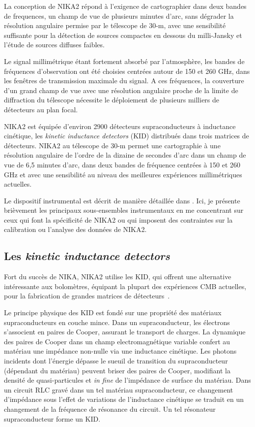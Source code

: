 La conception de NIKA2 répond à l'exigence de cartographier dans deux
bandes de frequences, un champ de vue de plusieurs minutes d'arc, sans
dégrader la résolution angulaire permise par le télescope de 30-m,
avec une sensibilité suffisante pour la détection de sources compactes
en dessous du milli-Jansky et l'étude de sources diffuses faibles.

Le signal millimétrique étant fortement absorbé par l'atmosphère, les
bandes de fréquences d'observation ont été choisies centrées
autour de 150 et 260 GHz, dans les fenêtres de transmission maximale
du signal. A ces fréquences, la couverture d'un grand champ de vue
avec une résolution angulaire proche de la limite de diffraction du
télescope nécessite le déploiement de plusieurs milliers de détecteurs
au plan focal.

NIKA2 est équipée d'environ 2900 détecteurs supraconducteurs à inductance
cinétique, les \emph{kinetic inductance detectors} (KID) distribués
dans trois matrices de détecteurs. NIKA2 au télescope de 30-m permet
une cartographie à une résolution angulaire de l'ordre de la dizaine
de secondes d'arc dans un champ de vue de 6,5 minutes d'arc, dans deux
bandes de fréquence centrées à 150 et 260 GHz et avec une sensibilité
au niveau des meilleures expériences millimétriques actuelles.

Le dispositif instrumental est décrit de manière détaillée dans
\citet{Adam2018}. Ici, je présente brièvement les principaux
sous-ensembles instrumentaux en me concentrant sur ceux qui font la
spécificité de NIKA2 ou qui imposent des contraintes sur la
calibration ou l'analyse des données de NIKA2.


\subsection{Les \emph{kinetic inductance detectors}}
\label{se:kid}

Fort du succès de NIKA, NIKA2 utilise les KID, qui offrent une
alternative intéressante aux bolomètres, équipant la plupart des
expériences CMB actuelles, pour la fabrication de grandes matrices de
détecteurs~\citep{Day2003, Doyle2008_LEKID}. 

Le principe physique des KID est fondé sur une propriété des matériaux
supraconducteurs en couche mince. Dans un supraconducteur, les
électrons s'associent en paires de Cooper, assurant le transport de
charges. La dynamique des paires de Cooper dans un champ
electromagnétique variable confert au matériau une impédance non-nulle
via une inductance cinétique. Les photons incidents dont
l'énergie dépasse le sueuil de transition du supraconducteur (dépendant
du matériau) peuvent briser des paires de Cooper, modifiant la densité
de quasi-particules et \emph{in fine} de l'impédance de surface du
matériau. Dans un circuit RLC gravé dans un tel matériau
supraconducteur, ce changement d'impédance sous l'effet de variations
de l'inductance cinétique se traduit en un changement
de la fréquence de résonance du circuit. Un tel résonateur
supraconducteur forme un KID. 

